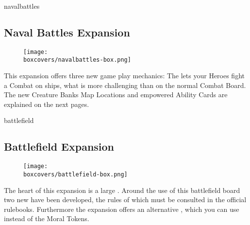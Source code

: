 \begin{multicols*}{2}
\begin{expansion}[title=]{navalbattles}
    \subsection*{\color{navalbattles}Naval Battles Expansion}
    \setlength\intextsep{0pt}
    \setlength\columnsep{0.8em}
    \begin{wrapfigure}{l}{0.35\textwidth}
        \texttt{[image: \\boxcovers/navalbattles-box.png]}
    \end{wrapfigure}
    This expansion offers three new game play mechanics:
    The  lets your Heroes fight a Combat on ships, what is more challenging than on the normal Combat Board.
    The new Creature Banks Map Locations and empowered Ability Cards are explained on the next pages.
\end{expansion}

\columnbreak
\begin{expansion}[title=]{battlefield}
    \subsection*{\color{battlefield}Battlefield Expansion}
    \setlength\intextsep{0pt}
    \setlength\columnsep{0.8em}
    \begin{wrapfigure}{l}{0.35\textwidth}
        \texttt{[image: \\boxcovers/battlefield-box.png]}
    \end{wrapfigure}
    The heart of this expansion is a large . Around the use of this battlefield board two new  have been developed, the rules of which must be consulted in the official rulebooks. Furthermore the expansion offers an alternative , which you can use instead of the Moral Tokens.
\end{expansion}
\end{multicols*}

